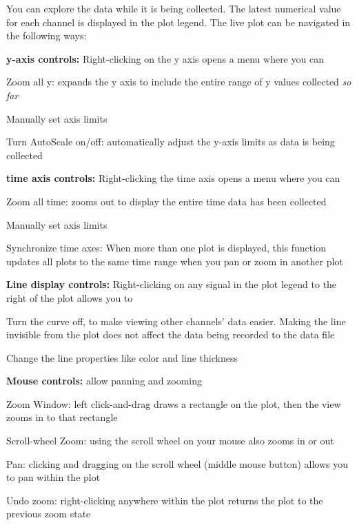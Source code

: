 You can explore the data while it is being collected. The latest numerical value for each channel is displayed in the plot legend. The live plot can be navigated in the following ways\-:
\begin{DoxyItemize}
\item {\bfseries y-\/axis controls\-:} Right-\/clicking on the y axis opens a menu where you can
\begin{DoxyItemize}
\item Zoom all y\-: expands the y axis to include the entire range of y values collected {\itshape so} {\itshape far} 
\item Manually set axis limits
\item Turn Auto\-Scale on/off\-: automatically adjust the y-\/axis limits as data is being collected
\end{DoxyItemize}
\item {\bfseries time axis controls\-:} Right-\/clicking the time axis opens a menu where you can
\begin{DoxyItemize}
\item Zoom all time\-: zooms out to display the entire time data has been collected
\item Manually set axis limits
\item Synchronize time axes\-: When more than one plot is displayed, this function updates all plots to the same time range when you pan or zoom in another plot
\end{DoxyItemize}
\item {\bfseries Line display controls\-:} Right-\/clicking on any signal in the plot legend to the right of the plot allows you to
\begin{DoxyItemize}
\item Turn the curve off, to make viewing other channels' data easier. Making the line invisible from the plot does not affect the data being recorded to the data file
\item Change the line properties like color and line thickness
\end{DoxyItemize}
\item {\bfseries Mouse controls\-:} allow panning and zooming
\begin{DoxyItemize}
\item Zoom Window\-: left click-\/and-\/drag draws a rectangle on the plot, then the view zooms in to that rectangle
\item Scroll-\/wheel Zoom\-: using the scroll wheel on your mouse also zooms in or out
\item Pan\-: clicking and dragging on the scroll wheel (middle mouse button) allows you to pan within the plot
\item Undo zoom\-: right-\/clicking anywhere within the plot returns the plot to the previous zoom state 
\end{DoxyItemize}
\end{DoxyItemize}